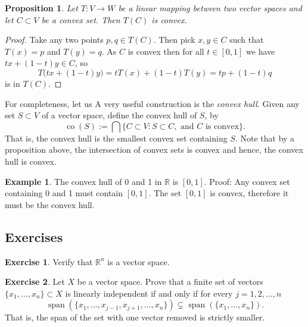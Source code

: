 \documentclass[12pt]{book}
\newcommand{\R}{{\mathbb{R}}}
\newcommand{\spn}{\operatorname{span}}
\newcommand{\myindex}[1]{#1\index{#1}}
\theoremstyle{plain}
\newtheorem{prop}[thm]{Proposition}
\theoremstyle{remark}
\theoremstyle{definition}
\theoremstyle{exercise}
\newtheorem{exercise}{Exercise}[section]
\theoremstyle{example}
\newtheorem{example}[thm]{Example}
\begin{document}
\begin{prop}
Let $T \colon V \to W$ be a linear mapping between two vector spaces and
let $C \subset V$ be a convex set.  Then $T(C)$ is convex.
\end{prop}

\begin{proof}
Take any two points $p,q \in T(C)$.  Then pick $x,y \in C$ such that
$T(x) = p$ and $T(y)=q$.  As $C$ is convex then for all $t \in [0,1]$
we have $tx+(1-t)y \in C$, so
\begin{equation*}
T\bigl(tx+(1-t)y\bigr)
=
tT(x)+(1-t)T(y)
=
tp+(1-t)q 
\end{equation*}
is in $T(C)$.
\end{proof}

For completeness, let us A very useful construction is the
\emph{\myindex{convex hull}}.  Given any set $S \subset V$ of a vector
space, define the convex hull of $S$, by
\begin{equation*}
\operatorname{co}(S) :=
\bigcap \{ C \subset V : S \subset C, \text{ and $C$ is convex} \} .
\end{equation*}
That is, the convex hull is the smallest convex set containing $S$.  Note
that by a proposition above, the intersection of convex sets is convex and
hence, the convex hull is convex.

\begin{example}
The convex hull of 0 and 1 in $\R$ is $[0,1]$.  Proof:
Any convex set containing 0 and 1 must contain $[0,1]$.  The set $[0,1]$
is convex, therefore it must be the convex hull.
\end{example}

\subsection{Exercises}

\begin{exercise}
Verify that $\R^n$ is a vector space.
\end{exercise}

\begin{exercise}
Let $X$ be a vector space.
Prove that a finite set of vectors $\{ x_1,\ldots,x_n \} \subset X$ 
is linearly independent if and only if for every $j=1,2,\ldots,n$
\begin{equation*}
\spn( \{ x_1,\ldots,x_{j-1},x_{j+1},\ldots,x_n \}) \subsetneq
\spn( \{ x_1,\ldots,x_n \}) .
\end{equation*}
That is, the span of the set with one vector removed is strictly smaller.
\end{exercise}
\end{document}
